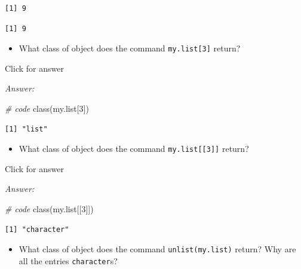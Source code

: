 \documentclass[
]{book}
\newenvironment{Shaded}{\begin{snugshade}}{\end{snugshade}}
\newcommand{\CommentTok}[1]{\textcolor[rgb]{0.56,0.35,0.01}{\textit{#1}}}
\newcommand{\DecValTok}[1]{\textcolor[rgb]{0.00,0.00,0.81}{#1}}
\newcommand{\FunctionTok}[1]{\textcolor[rgb]{0.00,0.00,0.00}{#1}}
\newcommand{\NormalTok}[1]{#1}
\newcommand{\SpecialCharTok}[1]{\textcolor[rgb]{0.00,0.00,0.00}{#1}}
\providecommand{\tightlist}{%
  \setlength{\itemsep}{0pt}\setlength{\parskip}{0pt}}
\begin{document}
\begin{verbatim}
[1] 9
\end{verbatim}

\begin{Shaded}
\end{Shaded}

\begin{verbatim}
[1] 9
\end{verbatim}

\begin{itemize}
\tightlist
\item
  What class of object does the command \texttt{my.list{[}3{]}} return?
\end{itemize}

Click for answer

\emph{Answer:}

\begin{Shaded}
\begin{Highlighting}[]
\CommentTok{\# code}
\FunctionTok{class}\NormalTok{(my.list[}\DecValTok{3}\NormalTok{])}
\end{Highlighting}
\end{Shaded}

\begin{verbatim}
[1] "list"
\end{verbatim}

\begin{itemize}
\tightlist
\item
  What class of object does the command \texttt{my.list{[}{[}3{]}{]}} return?
\end{itemize}

Click for answer

\emph{Answer:}

\begin{Shaded}
\begin{Highlighting}[]
\CommentTok{\# code}
\FunctionTok{class}\NormalTok{(my.list[[}\DecValTok{3}\NormalTok{]])}
\end{Highlighting}
\end{Shaded}

\begin{verbatim}
[1] "character"
\end{verbatim}

\begin{itemize}
\tightlist
\item
  What class of object does the command \texttt{unlist(my.list)} return? Why are all the entries \texttt{character}s?
\end{itemize}
\end{document}
